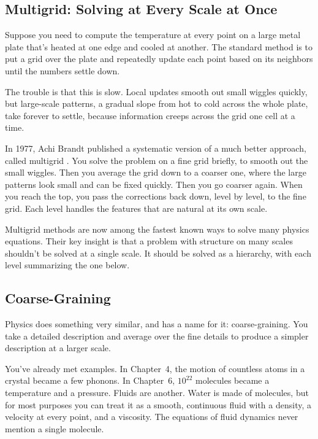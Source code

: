 \subsection{Multigrid: Solving at Every Scale at Once}

Suppose you need to compute the temperature at every point on a large metal plate that's heated at one edge and cooled at another. The standard method is to put a grid over the plate and repeatedly update each point based on its neighbors until the numbers settle down.

The trouble is that this is slow. Local updates smooth out small wiggles quickly, but large-scale patterns, a gradual slope from hot to cold across the whole plate, take forever to settle, because information creeps across the grid one cell at a time.

In 1977, Achi Brandt published a systematic version of a much better approach, called multigrid \cite{brandt1977}. You solve the problem on a fine grid briefly, to smooth out the small wiggles. Then you average the grid down to a coarser one, where the large patterns look small and can be fixed quickly. Then you go coarser again. When you reach the top, you pass the corrections back down, level by level, to the fine grid. Each level handles the features that are natural at its own scale.

Multigrid methods are now among the fastest known ways to solve many physics equations. Their key insight is that a problem with structure on many scales shouldn't be solved at a single scale. It should be solved as a hierarchy, with each level summarizing the one below.

\subsection{Coarse-Graining}

Physics does something very similar, and has a name for it: coarse-graining. You take a detailed description and average over the fine details to produce a simpler description at a larger scale.

You've already met examples. In Chapter~4, the motion of countless atoms in a crystal became a few phonons. In Chapter~6, \(10^{22}\) molecules became a temperature and a pressure. Fluids are another. Water is made of molecules, but for most purposes you can treat it as a smooth, continuous fluid with a density, a velocity at every point, and a viscosity. The equations of fluid dynamics never mention a single molecule.

